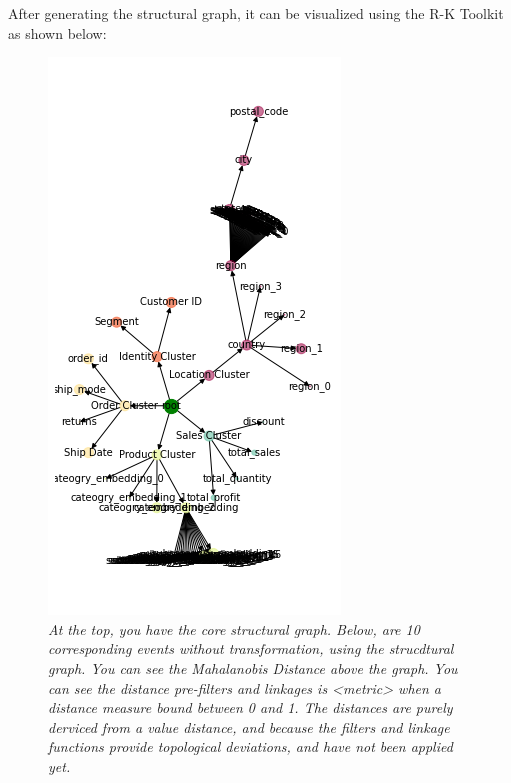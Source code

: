 After generating the structural graph, it can be visualized using the R-K Toolkit as shown below:

\begin{figure}[H]
	\centering
        \includegraphics[width=1.0\linewidth]{images/pre-filter-graphs.png}
	\caption{\textit{At the top, you have the core structural graph. Below, are 10 corresponding events without transformation, using the strucdtural graph. You can see the Mahalanobis Distance above the graph. You can see the distance pre-filters and linkages is <metric> when a distance measure bound between 0 and 1. The distances are purely derviced from a value distance, and because the filters and linkage functions provide topological deviations, and have not been applied yet.}}
	\label{fig:fig5}
\end{figure}

